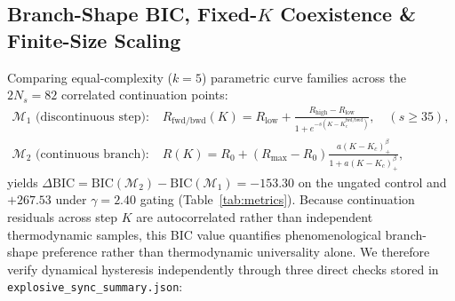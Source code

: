 \documentclass[11pt,a4paper]{article}
\begin{document}
\subsection{Branch-Shape BIC, Fixed-\texorpdfstring{$K$}{K} Coexistence \& Finite-Size Scaling}
Comparing equal-complexity ($k = 5$) parametric curve families across the $2N_s = 82$ correlated continuation points:
\begin{align}
    \mathcal{M}_1 \text{ (discontinuous step): } & R_{\mathrm{fwd/bwd}}(K) = R_{\mathrm{low}} + \frac{R_{\mathrm{high}} - R_{\mathrm{low}}}{1 + e^{-s(K - K_c^{\mathrm{fwd/bwd}})}}, \quad (s \ge 35), \\
    \mathcal{M}_2 \text{ (continuous branch): } & R(K) = R_0 + (R_{\max} - R_0)\frac{a(K - K_c)_+^\beta}{1 + a(K - K_c)_+^\beta},
\end{align}
yields $\Delta\mathrm{BIC} = \mathrm{BIC}(\mathcal{M}_2) - \mathrm{BIC}(\mathcal{M}_1) = -153.30$ on the ungated control and $+267.53$ under $\gamma = 2.40$ gating (Table~\ref{tab:metrics}). Because continuation residuals across step $K$ are autocorrelated rather than independent thermodynamic samples, this BIC value quantifies phenomenological branch-shape preference rather than thermodynamic universality alone. We therefore verify dynamical hysteresis independently through three direct checks stored in \texttt{explosive\_sync\_summary.json}:
\end{document}
